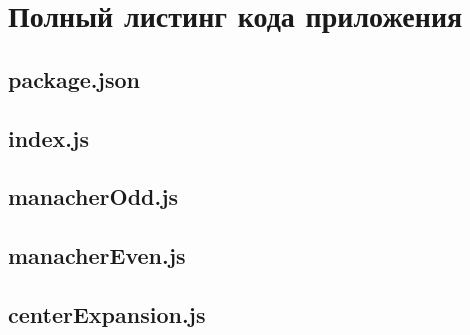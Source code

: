 \chapter{Полный листинг кода приложения}\label{appendix-app-code}

\section*{package.json}


\section*{index.js}


\section*{manacherOdd.js}


\section*{manacherEven.js}


\section*{centerExpansion.js}


